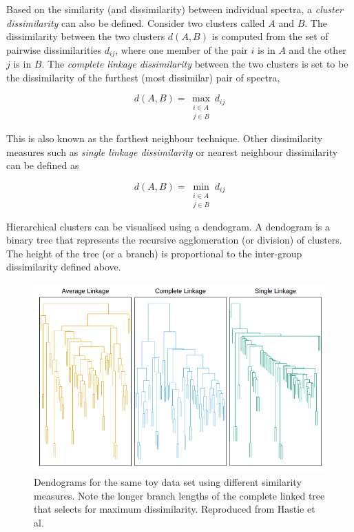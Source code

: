Based on the similarity (and dissimilarity) between individual spectra, a \emph{cluster dissimilarity} can also be defined. Consider two clusters called $A$ and $B$. The dissimilarity between the two clusters $d(A,B)$ is computed from the set of pairwise dissimilarities $d_{ij}$, where one member of the pair $i$ is in $A$ and the other $j$ is in $B$. The \emph{complete linkage dissimilarity} between the two clusters is set to be the dissimilarity of the furthest (most dissimilar) pair of spectra,

\begin{equation}
    d(A,B) = \max_{\substack{i \in A \\ j \in B}} d_{ij}
\end{equation}

This is also known as the farthest neighbour technique. Other dissimilarity measures such as \emph{single linkage dissimilarity} or nearest neighbour dissimilarity can be defined as

\begin{equation}
    d(A,B) = \min_{\substack{i \in A \\ j \in B}} d_{ij}
\end{equation}

Hierarchical clusters can be visualised using a dendogram. A dendogram is a binary tree that represents the recursive agglomeration (or division) of clusters. The height of the tree (or a branch) is proportional to the inter-group dissimilarity defined above. 

\begin{figure}[!htb]
\centering
\includegraphics[scale=0.60]{figures/complete linkage.png}
\caption{Dendograms for the same toy data set using different similarity measures. Note the longer branch lengths of the complete linked tree that selects for maximum dissimilarity. Reproduced from Hastie et al.\cite{hastie2009elements}}
\end{figure}

